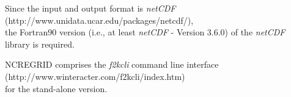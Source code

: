 \documentclass[12pt, a4paper]{article}
\begin{document}
Since the input and output format is {\it netCDF}\\
(http://www.unidata.ucar.edu/packages/netcdf/),\\
the Fortran90 version (i.e., at least {\it netCDF} - Version 3.6.0)
of the {\it netCDF} library is required.

NCREGRID comprises the {\it f2kcli} command line interface\\
(http://www.winteracter.com/f2kcli/index.htm)\\
for the stand-alone version.

\end{document}

